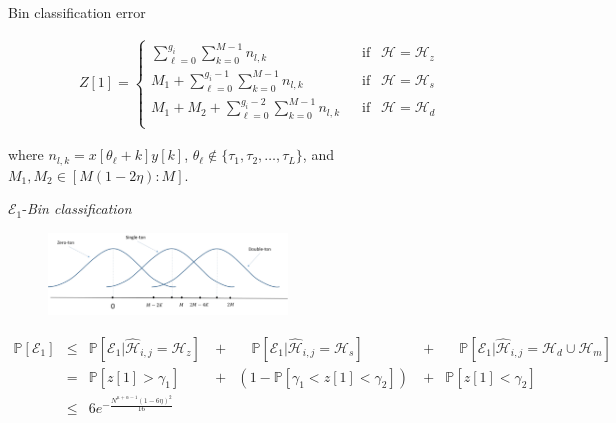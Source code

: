 \documentclass[10pt,xcolor=table]{beamer}
\newcommand{\mc}{\mathcal}
\newcommand{\mbb}{\mathbb}
\begin{document}
\begin{frame}{Bin classification error}
\vspace{-10pt}
{ \small
	\begin{align*} \nonumber
	Z[1]=\begin{cases}
	\sum\limits_{\ell=0}^{g_{i}}\sum\limits_{k=0}^{M-1} n_{l,k}  & ~~\text{ if } ~~ \mc{H}=\mc{H}_z\label{Eqn:BinCombination}\\
	M_1+\sum\limits_{\ell=0}^{g_{i}-1}\sum\limits_{k=0}^{M-1} n_{l,k}  & ~~\text{ if } ~~ \mc{H}=\mc{H}_s\\
	M_1+M_2+\sum\limits_{\ell=0}^{g_{i}-2}\sum\limits_{k=0}^{M-1} n_{l,k}  & ~~\text{ if } ~~ \mc{H}=\mc{H}_d\\
	\end{cases}
	\end{align*}
	
	where $n_{l,k}=x[\theta_{\ell}+k]y[k]$,  $\theta_{\ell}\notin\{\tau_1,\tau_2,\ldots,\tau_L\}$, and  $M_1,M_2\in[M(1-2\eta):M]$.
}


\begin{block}{$\mathcal{E}_1${-\it Bin classification}}
	\begin{figure}[t]
		\begin{center}
			\includegraphics[width=2.5in]{bin_statistics.pdf}
		\end{center}
	\end{figure}
	\vspace{-30pt}
	
	{\small \begin{align*}
		\mbb{P}[\mathcal{E}_1] & \leq & \mbb{P}[\mathcal{E}_1|\widehat{\mathcal{H}}_{i,j}=\mc{H}_z]~& + &
		\quad \mbb{P}[\mathcal{E}_1|\widehat{\mathcal{H}}_{i,j}=\mathcal{H}_s]~~~~~& + &
		\quad \mbb{P}[\mc{E}_1|\widehat{\mathcal{H}}_{i,j}=\mathcal{H}_d \cup \mathcal{H}_m]\\
		~& = & \mbb{P}[z[1]>\gamma_1] ~& + & (1- \mbb{P}[\gamma_1<z[1]<\gamma_2])  ~& + & \mbb{P}[z[1]<\gamma_2]~~~~~~\\
        & \leq & 6e^{-\frac{N^{\mu+\alpha-1}(1-6\eta)^2}{16}} \\
		\end{align*}		
	}
	\vspace{-15pt}
\end{block}
\end{frame}
\end{document}
